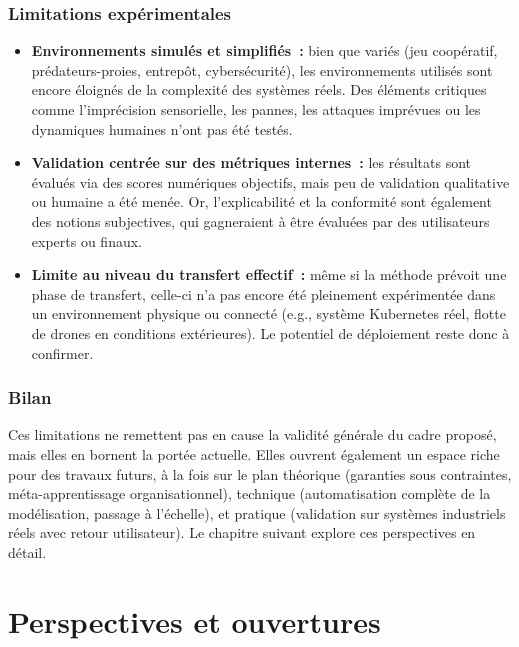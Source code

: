 \subsection*{Limitations expérimentales}

\begin{itemize}
    \item \textbf{Environnements simulés et simplifiés~:} bien que variés (jeu coopératif, prédateurs-proies, entrepôt, cybersécurité), les environnements utilisés sont encore éloignés de la complexité des systèmes réels. Des éléments critiques comme l’imprécision sensorielle, les pannes, les attaques imprévues ou les dynamiques humaines n’ont pas été testés.

    \item \textbf{Validation centrée sur des métriques internes~:} les résultats sont évalués via des scores numériques objectifs, mais peu de validation qualitative ou humaine a été menée. Or, l’explicabilité et la conformité sont également des notions subjectives, qui gagneraient à être évaluées par des utilisateurs experts ou finaux.

    \item \textbf{Limite au niveau du transfert effectif~:} même si la méthode prévoit une phase de transfert, celle-ci n’a pas encore été pleinement expérimentée dans un environnement physique ou connecté (e.g., système Kubernetes réel, flotte de drones en conditions extérieures). Le potentiel de déploiement reste donc à confirmer.
\end{itemize}

\subsection*{Bilan}

\noindent
Ces limitations ne remettent pas en cause la validité générale du cadre proposé, mais elles en bornent la portée actuelle. Elles ouvrent également un espace riche pour des travaux futurs, à la fois sur le plan théorique (garanties sous contraintes, méta-apprentissage organisationnel), technique (automatisation complète de la modélisation, passage à l’échelle), et pratique (validation sur systèmes industriels réels avec retour utilisateur). Le chapitre suivant explore ces perspectives en détail.


\chapter{Perspectives et ouvertures}
\label{chap:perspectives}

